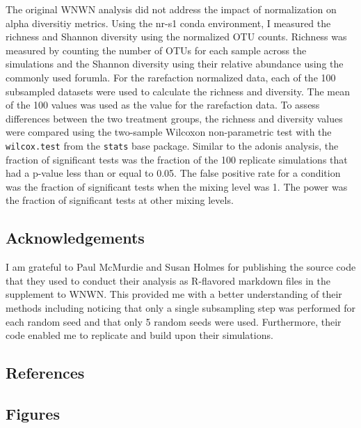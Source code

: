 \documentclass[
]{article}
\newlength{\cslhangindent}
\newlength{\cslentryspacingunit} %
\newenvironment{CSLReferences}[2] %
 {%
  \setlength{\parindent}{0pt}
  \ifodd #1
  \let\oldpar\par
  \def\par{\hangindent=\cslhangindent\oldpar}
  \fi
  \setlength{\parskip}{#2\cslentryspacingunit}
 }%
 {}
\begin{document}
The original WNWN analysis did not address the impact of normalization
on alpha diversitiy metrics. Using the nr-s1 conda environment, I
measured the richness and Shannon diversity using the normalized OTU
counts. Richness was measured by counting the number of OTUs for each
sample across the simulations and the Shannon diversity using their
relative abundance using the commonly used forumla. For the rarefaction
normalized data, each of the 100 subsampled datasets were used to
calculate the richness and diversity. The mean of the 100 values was
used as the value for the rarefaction data. To assess differences
between the two treatment groups, the richness and diversity values were
compared using the two-sample Wilcoxon non-parametric test with the
\texttt{wilcox.test} from the \texttt{stats} base package. Similar to
the adonis analysis, the fraction of significant tests was the fraction
of the 100 replicate simulations that had a p-value less than or equal
to 0.05. The false positive rate for a condition was the fraction of
significant tests when the mixing level was 1. The power was the
fraction of significant tests at other mixing levels.

\hypertarget{acknowledgements}{%
\subsection{Acknowledgements}\label{acknowledgements}}

I am grateful to Paul McMurdie and Susan Holmes for publishing the
source code that they used to conduct their analysis as R-flavored
markdown files in the supplement to WNWN. This provided me with a better
understanding of their methods including noticing that only a single
subsampling step was performed for each random seed and that only 5
random seeds were used. Furthermore, their code enabled me to replicate
and build upon their simulations.

\newpage

\hypertarget{references}{%
\subsection{References}\label{references}}

\setlength{\parindent}{-0.25in}
\setlength{\leftskip}{0.25in}

\noindent

\hypertarget{refs}{}
\begin{CSLReferences}{0}{0}
\end{CSLReferences}


\setlength{\parindent}{0in}
\setlength{\leftskip}{0in}

\newpage

\hypertarget{figures}{%
\subsection{Figures}\label{figures}}
\end{document}
